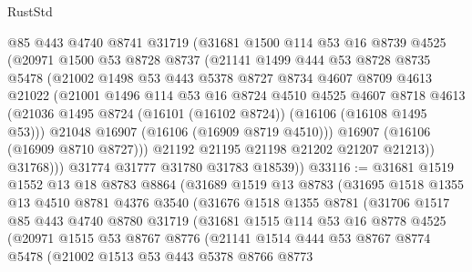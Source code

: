 \begin{lexlean}{RustStd}
\begin{coremodule}
            @85
            @443
            @4740
            @8741
            @31719
            (@31681
              @1500
              @114
              @53
              @16
              @8739
              @4525
              (@20971
                @1500
                @53
                @8728
                @8737
                (@21141
                  @1499
                  @444
                  @53
                  @8728
                  @8735
                  @5478
                  (@21002
                    @1498
                    @53
                    @443
                    @5378
                    @8727
                    @8734
                    @4607
                    @8709
                    @4613
                    @21022
                    (@21001
                      @1496
                      @114
                      @53
                      @16
                      @8724
                      @4510
                      @4525
                      @4607
                      @8718
                      @4613
                      (@21036 @1495 @8724 (@16101 (@16102 @8724)) (@16106 (@16108 @1495 @53)))
                      @21048
                      @16907
                      (@16106 (@16909 @8719 @4510)))
                    @16907
                    (@16106 (@16909 @8710 @8727)))
                  @21192
                  @21195
                  @21198
                  @21202
                  @21207
                  @21213))
              @31768)))
        @31774
        @31777
        @31780
        @31783
        @18539))
@33116 := @31681
    @1519
    @1552
    @13
    @18
    @8783
    @8864
    (@31689
      @1519
      @13
      @8783
      (@31695
        @1518
        @1355
        @13
        @4510
        @8781
        @4376
        @3540
        (@31676
          @1518
          @1355
          @8781
          (@31706
            @1517
            @85
            @443
            @4740
            @8780
            @31719
            (@31681
              @1515
              @114
              @53
              @16
              @8778
              @4525
              (@20971
                @1515
                @53
                @8767
                @8776
                (@21141
                  @1514
                  @444
                  @53
                  @8767
                  @8774
                  @5478
                  (@21002
                    @1513
                    @53
                    @443
                    @5378
                    @8766
                    @8773

\end{coremodule}
\end{lexlean}
